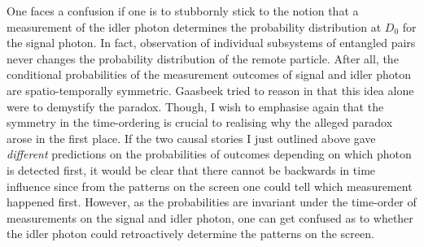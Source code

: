 \documentclass[12pt]{article}
\numberwithin{equation}{section}
\begin{document}
 

One faces a confusion if one is to stubbornly stick to the notion that a measurement of the idler photon determines the probability distribution at $D_0$ for the signal photon. In fact, observation of individual subsystems of entangled pairs never changes the probability distribution of the remote particle. After all, the conditional probabilities of the measurement outcomes of signal and idler photon are spatio-temporally symmetric. Gaasbeek tried to reason in \cite{Gaasbeek2010} that this idea alone were to demystify the paradox. Though, I wish to emphasise again that the symmetry in the time-ordering is crucial to realising why the alleged paradox arose in the first place. If the two causal stories I just outlined above gave \textit{different} predictions on the probabilities of outcomes depending on which photon is detected first, it would be clear that there cannot be backwards in time influence since from the patterns on the screen one could tell which measurement happened first. However, as the probabilities are invariant under the time-order of measurements on the signal and idler photon, one can get confused as to whether the idler photon could retroactively determine the patterns on the screen. 

\end{document}
